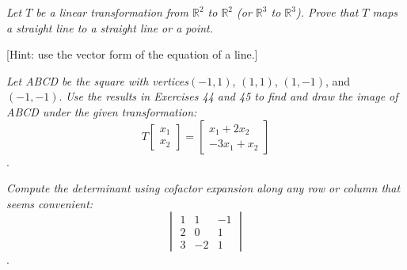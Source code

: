 \documentclass[12pt,letterpaper]{hmcpset}
\begin{document}
\begin{problem}[3.6.44]
    \textit{Let $T$ be a linear transformation from $\mathbb{R}^2$ to $\mathbb{R}^2$ (or $\mathbb{R}^3$ to $\mathbb{R}^3$). Prove that $T$ maps a straight line to a straight line or a point.} {\small [Hint: use the vector form of the equation of a line.]\par}
\end{problem}

\begin{solution}
    
\end{solution}

\newpage


\begin{problem}[3.6.50]
    \textit{Let ABCD be the square with vertices}{\small $(-1, 1)$, $(1, 1)$, $(1, -1)$, and $(-1, -1)$}.
    \textit{Use the results in Exercises 44 and 45 to find and draw the image of ABCD under the given transformation:}
    \[T\begin{bmatrix}
    x_1 \\ x_2
    \end{bmatrix}=
    \begin{bmatrix}
    x_1 + 2x_2 \\ -3x_1 + x_2
    \end{bmatrix}
    \].
\end{problem}

\begin{solution}
    
\end{solution}

\newpage


\begin{problem}[4.2.8]
    \textit{Compute the determinant using cofactor expansion along any row or column that seems convenient:}
    \[\begin{vmatrix}
    1 &  1 & -1 \\
    2 &  0 &  1 \\
    3 & -2 &  1 
    \end{vmatrix}\].
\end{problem}

\begin{solution}
    
\end{solution}

\newpage
\end{document}

